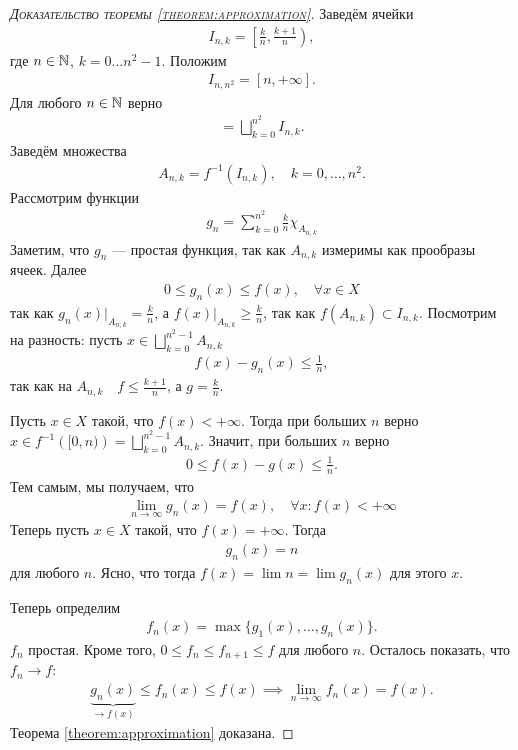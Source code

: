 \documentclass[a4paper,14pt]{extarticle}
\theoremstyle{definition}
\theoremstyle{plain}
\theoremstyle{plain}
\theoremstyle{plain}
\theoremstyle{plain}
\theoremstyle{definition}
\theoremstyle{definition}
\theoremstyle{definition}
\theoremstyle{definition}
\theoremstyle{definition}
\theoremstyle{definition}
\theoremstyle{plain}
\theoremstyle{plain}
\theoremstyle{plain}
\theoremstyle{plain}
\theoremstyle{definition}
\theoremstyle{definition}
\theoremstyle{definition}
\theoremstyle{definition}
\theoremstyle{definition}
\newcommand{\N}{\ensuremath \mathbb{N}}
\begin{document}
\begin{proof}[\textsc{Доказательство теоремы \ref{theorem:approximation}}]
 Заведём ячейки \begin{align*}
  I_{n,k} = \left[\frac{k}{n}, \frac{k+1}{n}\right)
 ,\end{align*} где $n \in \N$, $k = 0 \ldots n^{2} - 1$. Положим \begin{align*}
 I_{n,n^{2}} = [n, +\infty]
 .\end{align*} Для любого $n \in \N$ верно \begin{align*}
 [0, +\infty] = \bigsqcup_{k=0}^{n^{2}} I_{n,k}
 .\end{align*} Заведём множества \begin{align*}
 A_{n,k} = f^{-1} \left( I_{n,k} \right), \quad k = 0, \ldots, n^{2}
 .\end{align*}
 Рассмотрим функции \begin{align*}
 g_n = \sum_{k=0}^{n^{2}} \frac{k}{n} \chi_{A_{n,k}}
\end{align*}
Заметим, что $g_n$ --- простая функция, так как $A_{n,k}$ измеримы как прообразы ячеек. Далее  \begin{align*}
 0 \leqslant g_n(x) \leqslant f(x), \quad \forall x \in X
 \end{align*} так как $g_n(x) \rvert_{A_{n,k}} = \frac{k}{n}$, а $f(x) \rvert_{A_{n,k}} \geqslant \frac{k}{n}$, так как $f(A_{n,k}) \subset I_{n,k}$.
 Посмотрим на разность: пусть $x \in \bigsqcup_{k=0}^{n^{2} - 1} A_{n,k} $
 \begin{align*}
 f(x) - g_n(x) \leqslant \frac{1}{n}
,\end{align*} так как на $A_{n,k} \quad f \leqslant \frac{k+1}{n}$, а $g  = \frac{k}{n}$.

Пусть $x \in X$ такой, что $f(x) < +\infty$. Тогда при больших $n$ верно $x \in f^{-1} \left( [0, n) \right) = \bigsqcup_{k=0}^{n^{2}-1} A_{n,k} $. Значит, при больших $n$ верно
\begin{align*}
 0 \leqslant f(x) - g(x) \leqslant \frac{1}{n}
.\end{align*} Тем самым, мы получаем, что \begin{align*}
\lim\limits_{n \to \infty} g_n(x) = f(x), \quad \forall x : f(x) < +\infty
\end{align*}
Теперь пусть $x \in X$ такой, что $f(x) = +\infty$. Тогда  \begin{align*}
 g_n(x) = n
\end{align*} для любого $n$. Ясно, что тогда $f(x) = \lim n = \lim g_n(x)$ для этого $x$.

Теперь определим \begin{align*}
 f_n(x) = \max\{g_1(x), \ldots, g_n(x)\}
.\end{align*} $f_n$ простая. Кроме того, $0 \leqslant f_n \leqslant f_{n+1} \leqslant f$ для любого $n$. Осталось показать, что $f_n \to f$: \begin{align*}
\underbrace{g_n(x)}_{\to f(x)} \leqslant f_n(x) \leqslant f(x) \implies \lim\limits_{n \to \infty} f_n(x) = f(x)
.\end{align*} Теорема \ref{theorem:approximation} доказана.
\end{proof}
\end{document}
